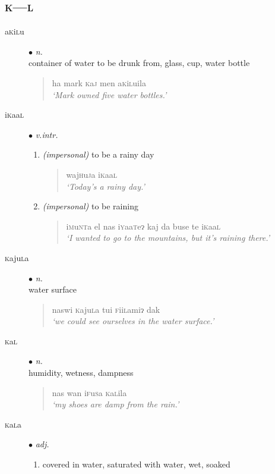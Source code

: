 \documentclass[a4paper,10pt,twoside,openright]{memoir}
\newcommand{\lilglot}{ɂ}
\begin{document}
\begin{multicols*}{2}
\section{\textsc{k---l}}
\begin{description}
    \item[a\textsc{k}i\textsc{l}u] $\bullet$ \textit{n.}\hfill\\
        container of water to be drunk from, glass, cup, water bottle
        \begin{quote}
            ha mark \textsc{k}a\textsc{j} men a\textsc{k}i\textsc{l}uila\\
            \textit{`Mark owned five water bottles.'}
        \end{quote}
    \item[i\textsc{k}aa\textsc{l}] $\bullet$ \textit{v.intr.}\hfill 
    \begin{enumerate}
        \item \textit{(impersonal)} to be a rainy day
        \begin{quote}
            waj\textsc{h}u\textsc{j}a i\textsc{k}aa\textsc{l}\\
            \textit{`Today's a rainy day.'}
        \end{quote}
        \item \textit{(impersonal)} to be raining
        \begin{quote}
            i\textsc{m}u\textsc{nt}a el nas i\textsc{y}aa\textsc{t}e\lilglot{} kaj da buse te i\textsc{k}aa\textsc{l}\\
            \textit{`I wanted to go to the mountains, but it's raining there.'}
        \end{quote}
    \end{enumerate}
    \item[\textsc{k}aju\textsc{l}a] $\bullet$ \textit{n.}\hfill\\
        water surface
        \begin{quote}
            naswi \textsc{k}aju\textsc{l}a tui \textsc{f}ii\textsc{l}ami\lilglot{} dak\\
            \textit{`we could see ourselves in the water surface.'}
        \end{quote} 
    \item[\textsc{k}a\textsc{l}] $\bullet$ \textit{n.}\hfill\\
        humidity, wetness, dampness
        \begin{quote}
            nas wan i\textsc{f}u\textsc{s}a \textsc{k}a\textsc{l}ila\\
            \textit{`my shoes are damp from the rain.'}
        \end{quote}
    \item[\textsc{k}a\textsc{l}a] $\bullet$ \textit{adj.}\hfill
    \begin{enumerate}
        \item covered in water, saturated with water, wet, soaked
        \begin{quote}
            

\end{quote}
\end{enumerate}
\end{description}
\end{multicols*}
\end{document}
